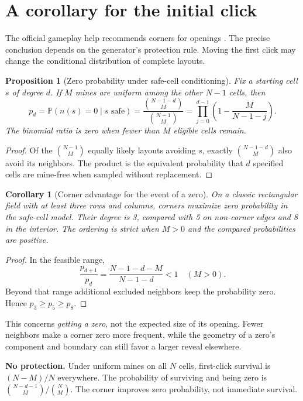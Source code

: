 \documentclass[11pt,letterpaper]{article}
\newtheorem{proposition}{Proposition}
\newtheorem{corollary}{Corollary}
\newcommand{\Prb}{\mathbb{P}}
\begin{document}
\section{A corollary for the initial click}
The official gameplay help recommends corners for openings \cite{gameplay}. The precise conclusion depends on the generator's protection rule. Moving the first click may change the conditional distribution of complete layouts.

\begin{proposition}[Zero probability under safe-cell conditioning]\label{prop:zero}
Fix a starting cell $s$ of degree $d$. If $M$ mines are uniform among the other $N-1$ cells, then
\begin{equation}\label{eq:pzero}
 p_d=\Prb(n(s)=0\mid s\text{ safe})
 =\frac{\binom{N-1-d}{M}}{\binom{N-1}{M}}
 =\prod_{j=0}^{d-1}\left(1-\frac{M}{N-1-j}\right).
\end{equation}
The binomial ratio is zero when fewer than $M$ eligible cells remain.
\end{proposition}
\begin{proof}
Of the $\binom{N-1}{M}$ equally likely layouts avoiding $s$, exactly $\binom{N-1-d}{M}$ also avoid its neighbors. The product is the equivalent probability that $d$ specified cells are mine-free when sampled without replacement.
\end{proof}

\begin{corollary}[Corner advantage for the event of a zero]\label{cor:corner}
On a classic rectangular field with at least three rows and columns, corners maximize zero probability in the safe-cell model. Their degree is 3, compared with 5 on non-corner edges and 8 in the interior. The ordering is strict when $M>0$ and the compared probabilities are positive.
\end{corollary}
\begin{proof}
In the feasible range,
\[
 \frac{p_{d+1}}{p_d}=\frac{N-1-d-M}{N-1-d}<1\quad(M>0).
\]
Beyond that range additional excluded neighbors keep the probability zero. Hence $p_3\geq p_5\geq p_8$.
\end{proof}

This concerns \emph{getting a zero}, not the expected size of its opening. Fewer neighbors make a corner zero more frequent, while the geometry of a zero's component and boundary can still favor a larger reveal elsewhere.

\textbf{No protection.} Under uniform mines on all $N$ cells, first-click survival is $(N-M)/N$ everywhere. The probability of surviving and being zero is $\binom{N-d-1}{M}/\binom{N}{M}$. The corner improves zero probability, not immediate survival.
\end{document}

